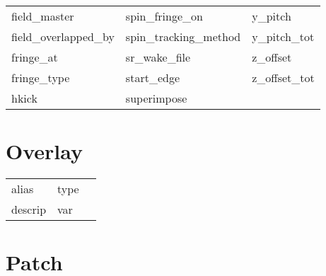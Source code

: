 \begin{tabular}{lll}
field_master                & spin_fringe_on              & y_pitch                     \\
field_overlapped_by         & spin_tracking_method        & y_pitch_tot                 \\
fringe_at                   & sr_wake_file                & z_offset                    \\
fringe_type                 & start_edge                  & z_offset_tot                \\
hkick                       & superimpose                 &                             \\
 \bottomrule
 \end{tabular}
 \vfill
 
 \section{Overlay}
 \label{s:list.overlay}
 
 \begin{tabular}{lll} \toprule
alias                       & type                        &                             \\
descrip                     & var                         &                             \\
 \bottomrule
 \end{tabular}
 \vfill
 
 \section{Patch}
 \label{s:list.patch}
 
